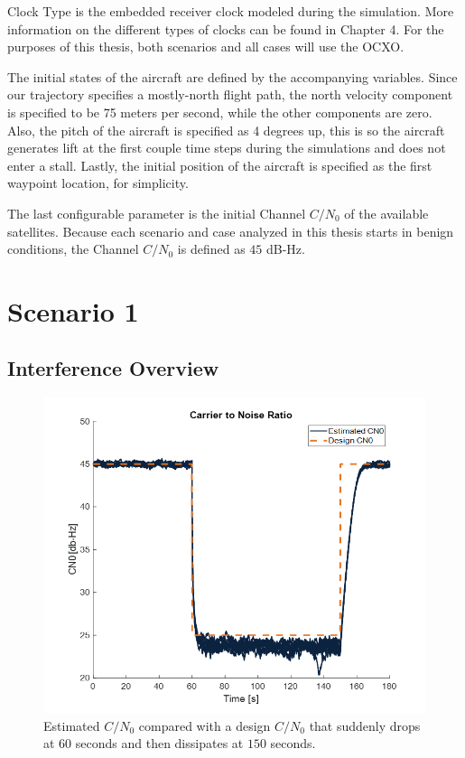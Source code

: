 Clock Type is the embedded receiver clock modeled during the simulation. More information on the different types of clocks can be found in Chapter 4. For the purposes of this thesis, both scenarios and all cases will use the OCXO\@.

The initial states of the aircraft are defined by the accompanying variables. Since our trajectory specifies a mostly-north flight path, the north velocity component is specified to be 75 meters per second, while the other components are zero. Also, the pitch of the aircraft is specified as 4 degrees up, this is so the aircraft generates lift at the first couple time steps during the simulations and does not enter a stall. Lastly, the initial position of the aircraft is specified as the first waypoint location, for simplicity. 

The last configurable parameter is the initial Channel \(C/N_0\) of the available satellites. Because each scenario and case analyzed in this thesis starts in benign conditions, the Channel \(C/N_0\) is defined as \(45\) dB-Hz.

\section{\textbf{Scenario 1}}

\subsection{\textbf{Interference Overview}}

\begin{figure}[!ht]
    \centering
    \includegraphics[width=0.75\linewidth]{Figures/Results/CN025.png}
    \caption{Estimated \(C/N_0\) compared with a design \(C/N_0\) that suddenly drops at \(60\) seconds and then dissipates at \(150\) seconds. }\label{fig:CN025}
\end{figure}


